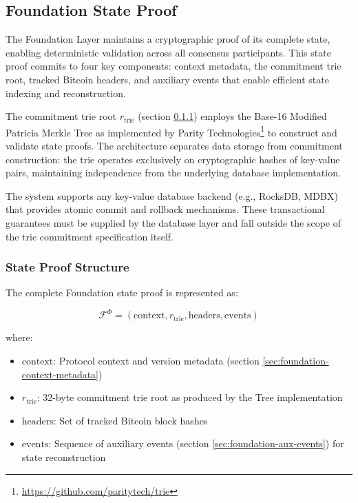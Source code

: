 \subsection{Foundation State Proof}
\label{sec:foundation-state-proof}

The Foundation Layer maintains a cryptographic proof of its complete state, enabling deterministic validation across all consensus participants. This state proof commits to four key components: context metadata, the commitment trie root, tracked Bitcoin headers, and auxiliary events that enable efficient state indexing and reconstruction.

The commitment trie root $r_{\text{trie}}$ (section \ref{sec:foundation-state-proof-structure}) employs the Base-16 Modified Patricia Merkle Tree as implemented by Parity Technologies\footnote{\url{https://github.com/paritytech/trie}} to construct and validate state proofs. The architecture separates data storage from commitment construction: the trie operates exclusively on cryptographic hashes of key-value pairs, maintaining independence from the underlying database implementation.

The system supports any key-value database backend (e.g., RocksDB, MDBX) that provides atomic commit and rollback mechanisms. These transactional guarantees must be supplied by the database layer and fall outside the scope of the trie commitment specification itself.

\subsubsection{State Proof Structure}
\label{sec:foundation-state-proof-structure}

The complete Foundation state proof is represented as:

\begin{equation}
    \mathcal{F}^{\Phi} = (\text{context}, r_{\text{trie}}, \text{headers}, \text{events})
\end{equation}

where:
\begin{itemize}
    \item $\text{context}$: Protocol context and version metadata (section \ref{sec:foundation-context-metadata})
    \item $r_{\text{trie}}$: 32-byte commitment trie root as produced by the Tree implementation
    \item $\text{headers}$: Set of tracked Bitcoin block hashes
    \item $\text{events}$: Sequence of auxiliary events (section \ref{sec:foundation-aux-events}) for state reconstruction
\end{itemize}

